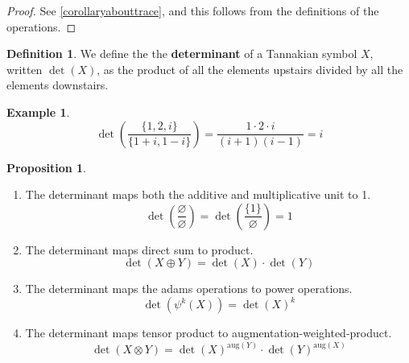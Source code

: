 \documentclass[a4paper]{article}
\theoremstyle{definition}
\newtheorem{definition}{Definition}[section]
\newtheorem{example}{Example}[section]
\newtheorem{proposition}[theorem]{Proposition}
\theoremstyle{remark}
\newcommand{\aug}{\mathrm{aug}}
\newcommand{\defhl}[1]{\textbf{#1}}
\begin{document}
\begin{proof}
See \ref{corollaryabouttrace}, and this follows from the definitions of the operations.
\end{proof}

\begin{definition}
We define the the \defhl{determinant} of a Tannakian symbol $X$, written $\det(X)$, as the product of all the elements upstairs divided by all the elements downstairs.
\end{definition}

\begin{example}
$$\det\left(\frac{\{1, 2, i\}}{\{1 + i, 1 - i\}}\right) = \frac{1 \cdot 2 \cdot i}{(i + 1)(i - 1)} = i$$
\end{example}

\begin{proposition}
\ \\ \begin{enumerate}
\item The determinant maps both the additive and multiplicative unit to 1.
$$\det\left(\frac{\varnothing}{\varnothing}\right) = \det\left(\frac{\{1\}}{\varnothing}\right) = 1$$
\item The determinant maps direct sum to product.
$$\det(X \oplus Y) = \det(X) \cdot \det(Y)$$
\item The determinant maps the adams operations to power operations.
$$\det(\psi^k(X)) = \det(X)^k$$
\item The determinant maps tensor product to augmentation-weighted-product.
$$\det(X \otimes Y) = \det(X)^{\aug(Y)} \cdot \det(Y)^{\aug(X)}$$
\end{enumerate}
\end{proposition}
\end{document}
